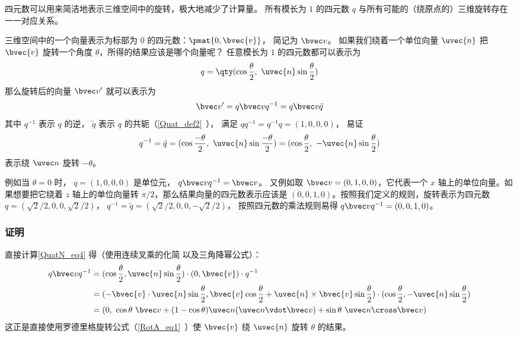 

四元数可以用来简洁地表示三维空间中的旋转，极大地减少了计算量。 所有模长为 $1$ 的四元数 $q$ 与所有可能的（绕原点的）三维旋转存在一一对应关系。

三维空间中的一个向量表示为标部为 $0$ 的四元数：$\pmat{0, \bvec{v}}$， 简记为 $\bvec v$。 如果我们绕着一个单位向量 ${\uvec{n}}$ 把 $\bvec{v}$ 旋转一个角度 $\theta$，所得的结果应该是哪个向量呢？ 任意模长为 $1$ 的四元数都可以表示为
\begin{equation}
q = \qty(\cos{\frac{\theta}{2}},\ {\uvec{n}}\sin{\frac{\theta}{2}})
\end{equation}
那么旋转后的向量 $\bvec v'$ 就可以表示为
\begin{equation}\label{QuatN_eq4}
\bvec v' = q\bvec vq^{-1} = q\bvec v \tilde q
\end{equation}
其中 $q^{-1}$ 表示 $q$ 的逆， $\tilde q$ 表示 $q$ 的共轭（\autoref{Quat_def2}~）， 满足 $qq^{-1} = q^{-1}q = (1,0,0,0)$， 易证
\begin{equation}
q^{-1} = \tilde q = (\cos{\frac{-\theta}{2}},\ {\uvec{n}}\sin{\frac{-\theta}{2}})
= (\cos{\frac{\theta}{2}},\ -{\uvec{n}}\sin{\frac{\theta}{2}})
\end{equation}
表示绕 $\uvec n$ 旋转 $-\theta$。

例如当 $\theta = 0$ 时， $q = (1,0,0,0)$ 是单位元， $q\bvec vq^{-1} = \bvec v$。 又例如取 $\bvec v = (0, 1, 0, 0)$，它代表一个 $x$ 轴上的单位向量。如果想要把它绕着 $z$ 轴上的单位向量转 $\pi/2$，那么结果向量的四元数表示应该是 $(0, 0, 1, 0)$。按照我们定义的规则，旋转表示为四元数 $q=(\sqrt{2}/2, 0, 0, \sqrt{2}/2)$， $q^{-1} = \tilde q = (\sqrt{2}/2,0,0,-\sqrt{2}/2)$， 按照四元数的乘法规则易得 $q\bvec v q^{-1}=(0,0,1,0)$。

\subsubsection{证明}
直接计算\autoref{QuatN_eq4} 得（使用连续叉乘的化简 以及三角降幂公式）：
\begin{equation}
\begin{aligned}
q\bvec vq^{-1}&= (\cos{\frac{\theta}{2}}, {\uvec{n}}\sin{\frac{\theta}{2}})\cdot (0, \bvec{v})\cdot q^{-1}\\&
=(-\bvec{v}\cdot {\uvec{n}}\sin{\frac{\theta}{2}}, \bvec{v}\cos{\frac{\theta}{2}}+ {\uvec{n}}\times\bvec{v}\sin{\frac{\theta}{2}})\cdot (\cos{\frac{\theta}{2}}, -{\uvec{n}}\sin{\frac{\theta}{2}})\\&
= (0,\ \cos\theta\ \bvec v + (1-\cos\theta)\uvec n(\uvec n\vdot \bvec v) + \sin\theta\ \uvec n\cross\bvec v)
\end{aligned}
\end{equation}
这正是直接使用罗德里格旋转公式（\autoref{RotA_eq1}~）使 $\bvec{v}$ 绕 ${\uvec{n}}$ 旋转 $\theta$ 的结果。

